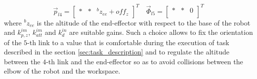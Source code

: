\[
\vec{p}_{l4} =
\begin{bmatrix}
  * & * & {}^{b} z_{ee} + off_z
\end{bmatrix}^{T}
\quad
\vec{\Phi}_{l5} =
\begin{bmatrix}
  * & * & 0\\
\end{bmatrix}^{T}
\]
where ${}^{b} z_{ee}$ is the altitude of the end-effector with respect to the base of the robot
and $k_{p,z}^{im}$, $k_{att}^{im}$ and $k_{d}^{in}$ are suitable gains.
Such a choice allows to fix the orientation of the $5$-th link to a value that is comfortable
during the execution of task described in the section \ref{sec:task_description} and to regulate the altitude between the $4$-th link and
the end-effector so as to avoid collisions between the elbow of the robot and the workspace.
\newpage

